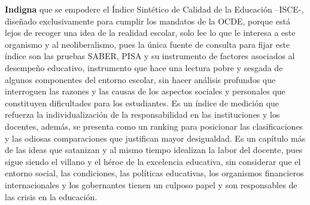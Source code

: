\documentclass[10pt]{article}
\begin{document}
\textbf{Indigna} que se empodere el Índice Sintético de Calidad de la Educación --ISCE-, diseñado exclusivamente para cumplir los mandatos de la OCDE, porque está lejos de recoger una
idea de la realidad escolar, solo lee lo que le interesa a este organismo y al neoliberalismo, pues la única fuente de consulta para fijar este índice son las pruebas SABER, PISA y su
instrumento de factores asociados al desempeño educativo, instrumento que hace una lectura pobre y sesgada de algunos componentes del entorno escolar, sin hacer análisis
profundos que interroguen las razones y las causas de los aspectos sociales y personales que constituyen dificultades para los estudiantes. Es un índice de medición que refuerza la
individualización de la responsabilidad en las instituciones y los docentes, además, se presenta como un ranking para posicionar las clasificaciones y las odiosas comparaciones
que justifican mayor desigualdad. Es un capítulo más de las ideas que satanizan y al mismo tiempo idealizan la labor del docente, pues sigue siendo el villano y el héroe de la
excelencia educativa, sin considerar que el entorno social, las condiciones, las políticas educativas, los organismos financieros internacionales y los gobernantes tienen un culposo
papel y son responsables de las crisis en la educación.
\end{document}

